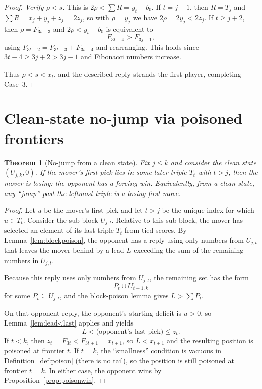 \documentclass[11pt]{article}
\newtheorem{theorem}{Theorem}[section]
\begin{document}
\begin{proof}
\smallskip\noindent
\emph{Verify $\rho<s$.}
This is $2\rho<\sum R=y_t-b_0$.
If $t=j+1$, then $R=T_j$ and $\sum R=x_j+y_j+z_j=2z_j$, so with $\rho=y_j$ we have $2\rho=2y_j<2z_j$.
If $t\ge j+2$, then $\rho=F_{3t-3}$ and $2\rho<y_t-b_0$ is equivalent to
\[
F_{3t-4}>F_{3j-1},
\]
using $F_{3t-2}=F_{3t-3}+F_{3t-4}$ and rearranging. This holds since $3t-4\ge 3j+2>3j-1$ and Fibonacci numbers increase.

Thus $\rho<s<x_t$, and the described reply strands the first player, completing Case~3.
\end{proof}

\section{Clean-state no-jump via poisoned frontiers}

\begin{theorem}[No-jump from a clean state]\label{thm:nojump}
Fix $j\le k$ and consider the clean state $(U_{j,k},0)$.
If the mover's first pick lies in some later triple $T_t$ with $t>j$, then the mover is losing: the opponent has a forcing win.
Equivalently, from a clean state, any ``jump'' past the leftmost triple is a losing first move.
\end{theorem}

\begin{proof}
Let $u$ be the mover's first pick and let $t>j$ be the unique index for which $u\in T_t$.
Consider the sub-block $U_{j,t}$. Relative to this sub-block, the mover has selected an element of its last triple $T_t$ from tied scores.
By Lemma~\ref{lem:blockpoison}, the opponent has a reply using only numbers from $U_{j,t}$ that leaves the mover behind by a lead $L$
exceeding the sum of the remaining numbers in $U_{j,t}$.

Because this reply uses only numbers from $U_{j,t}$, the remaining set has the form
\[
P_t\cup U_{t+1,k}
\]
for some $P_t\subseteq U_{j,t}$, and the block-poison lemma gives $L>\sum P_t$.

On that opponent reply, the opponent's starting deficit is $u>0$, so Lemma~\ref{lem:lead<last} applies and yields
\[
L<\text{(opponent's last pick)}\le z_t.
\]
If $t<k$, then $z_t=F_{3t}<F_{3t+1}=x_{t+1}$, so $L<x_{t+1}$ and the resulting position is poisoned at frontier $t$.
If $t=k$, the ``smallness'' condition is vacuous in Definition~\ref{def:poison} (there is no tail), so the position is still poisoned at frontier $t=k$.
In either case, the opponent wins by Proposition~\ref{prop:poisonwin}.
\end{proof}
\end{document}
